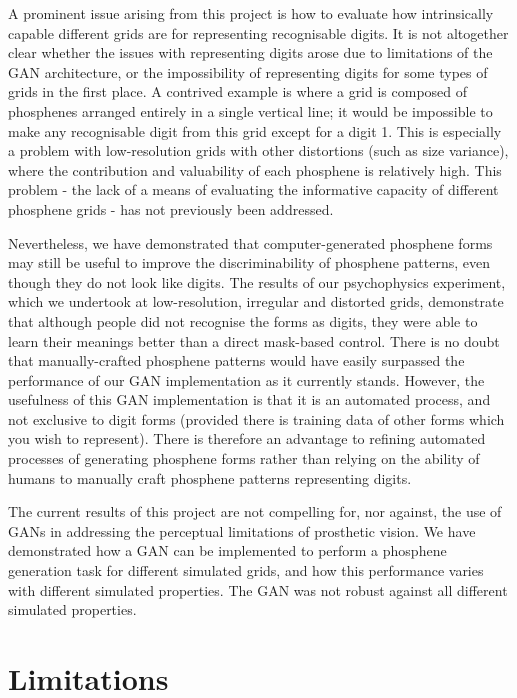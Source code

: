 \documentclass[a4paper,11pt,openany]{book}
\begin{document}
A prominent issue arising from this project is how to evaluate how intrinsically capable different grids are for representing recognisable digits.
It is not altogether clear whether the issues with representing digits arose due to limitations of the GAN architecture, or the impossibility of representing digits for some types of grids in the first place.
A contrived example is where a grid is composed of phosphenes arranged entirely in a single vertical line; it would be impossible to make any recognisable digit from this grid except for a digit 1.
This is especially a problem with low-resolution grids with other distortions (such as size variance), where the contribution and valuability of each phosphene is relatively high.
This problem - the lack of a means of evaluating the informative capacity of different phosphene grids - has not previously been addressed.

Nevertheless, we have demonstrated that computer-generated phosphene forms may still be useful to improve the discriminability of phosphene patterns, even though they do not look like digits.
The results of our psychophysics experiment, which we undertook at low-resolution, irregular and distorted grids, demonstrate that although people did not recognise the forms as digits, they were able to learn their meanings better than a direct mask-based control.
There is no doubt that manually-crafted phosphene patterns would have easily surpassed the performance of our GAN implementation as it currently stands.
However, the usefulness of this GAN implementation is that it is an automated process, and not exclusive to digit forms (provided there is training data of other forms which you wish to represent).
There is therefore an advantage to refining automated processes of generating phosphene forms rather than relying on the ability of humans to manually craft phosphene patterns representing digits.

The current results of this project are not compelling for, nor against, the use of GANs in addressing the perceptual limitations of prosthetic vision.
We have demonstrated how a GAN can be implemented to perform a phosphene generation task for different simulated grids, and how this performance varies with different simulated properties.
The GAN was not robust against all different simulated properties.

\chapter{Limitations}
\label{sec:org54495c3}
\end{document}
